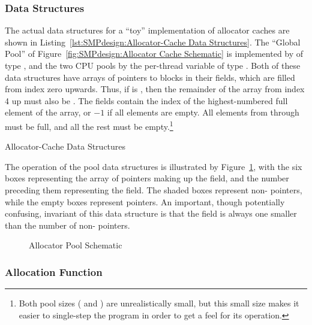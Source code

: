 \subsubsection{Data Structures}

The actual data structures for a ``toy'' implementation of allocator
caches are shown in
Listing~\ref{lst:SMPdesign:Allocator-Cache Data Structures}.
The ``Global Pool'' of Figure~\ref{fig:SMPdesign:Allocator Cache Schematic}
is implemented by  of type ,
and the two CPU pools by the per-thread variable  of
type .
Both of these data structures have arrays of pointers to blocks
in their  fields, which are filled from index zero upwards.
Thus, if  is , then the remainder of
the array from index 4 up must also be .
The  fields contain the index of the highest-numbered full
element of the  array, or $-1$ if all elements are empty.
All elements from  through
 must be full, and all the rest
must be empty.\footnote{
	Both pool sizes ( and
	) are unrealistically small, but this small
	size makes it easier to single-step the program in order to get
	a feel for its operation.}

\begin{listing}

\caption{Allocator-Cache Data Structures}
\label{lst:SMPdesign:Allocator-Cache Data Structures}
\end{listing}

The operation of the pool data structures is illustrated by
Figure~\ref{fig:SMPdesign:Allocator Pool Schematic},
with the six boxes representing the array of pointers making up
the  field, and the number preceding them representing
the  field.
The shaded boxes represent non- pointers, while the empty
boxes represent  pointers.
An important, though potentially confusing, invariant of this
data structure is that the  field is always one
smaller than the number of non- pointers.

\begin{figure}
\centering
{}
\caption{Allocator Pool Schematic}
\label{fig:SMPdesign:Allocator Pool Schematic}
\end{figure}

\subsubsection{Allocation Function}

